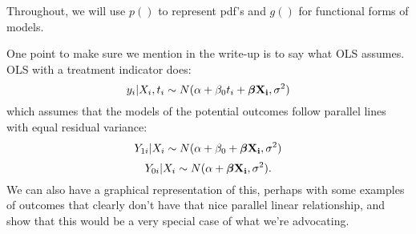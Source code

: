 \documentclass[oneside,letterpaper,titlepage,12pt]{article}
\begin{document}
Throughout, we will use $p()$ to represent pdf's and $g()$ for functional forms of models.

One point to make sure we mention in the write-up is to say what OLS assumes.  OLS with a treatment indicator does:
$$y_i|X_i, t_i \sim N(\alpha + \beta_0 t_i + {\boldsymbol \beta} {\bf X_i}, \sigma^2)$$
which assumes that the models of the potential outcomes follow parallel lines with equal residual variance:
$$Y_{1i}|X_i \sim N(\alpha + \beta_0 + {\boldsymbol \beta} {\bf X_i}, \sigma^2)$$
$$Y_{0i}|X_i \sim N(\alpha + {\boldsymbol \beta} {\bf X_i}, \sigma^2).$$
We can also have a graphical representation of this, perhaps with some examples of outcomes that clearly don't have that nice parallel linear relationship,
and show that this would be a very special case of what we're advocating.
\end{document}
